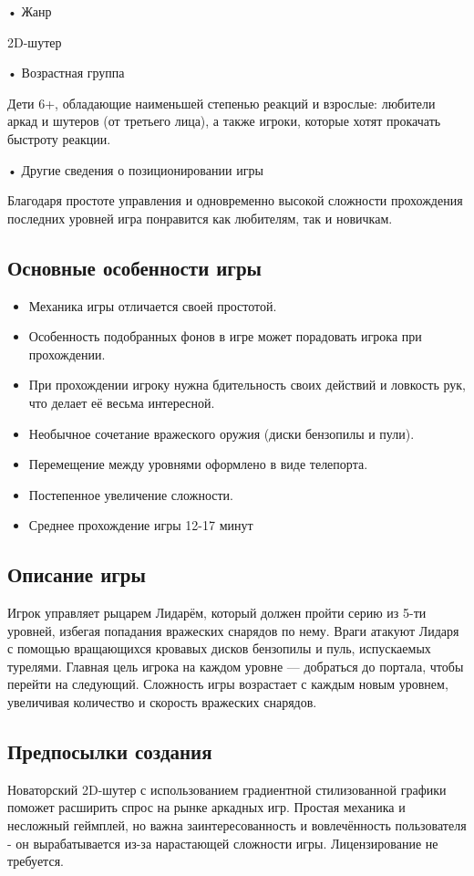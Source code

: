 \documentclass[a4paper,12pt]{article}
\begin{document}
• Жанр
    
    2D-шутер

• Возрастная группа
    
    Дети 6+, обладающие наименьшей степенью реакций и взрослые: любители аркад и шутеров (от третьего лица), а также игроки, которые хотят прокачать быстроту реакции.

• Другие сведения о позиционировании игры
    
    Благодаря простоте управления и одновременно высокой сложности прохождения последних уровней игра понравится как любителям, так и новичкам.

\subsection{Основные особенности игры}
\begin{itemize}
    \item Механика игры отличается своей простотой.
    \item Особенность подобранных фонов в игре может порадовать игрока при прохождении.
    \item При прохождении игроку нужна бдительность своих действий и ловкость рук, что делает её весьма интересной.
    \item Необычное сочетание вражеского оружия (диски бензопилы и пули).
    \item Перемещение между уровнями оформлено в виде телепорта.
    \item Постепенное увеличение сложности.
    \item Среднее прохождение игры 12-17 минут
\end{itemize}

\subsection{Описание игры}
Игрок управляет рыцарем Лидарём, который должен пройти серию из 5-ти уровней, избегая попадания вражеских снарядов по нему. Враги атакуют Лидаря с помощью вращающихся кровавых дисков бензопилы и пуль, испускаемых турелями.
Главная цель игрока на каждом уровне — добраться до портала, чтобы перейти на следующий. Сложность игры возрастает с каждым новым уровнем, увеличивая количество и скорость вражеских снарядов.

\subsection{Предпосылки создания}
Новаторский 2D-шутер с использованием градиентной стилизованной графики поможет расширить спрос на рынке аркадных игр.
Простая механика и несложный геймплей, но важна заинтересованность и вовлечённость пользователя - он вырабатывается из-за нарастающей сложности игры. 
Лицензирование не требуется.
\end{document}
